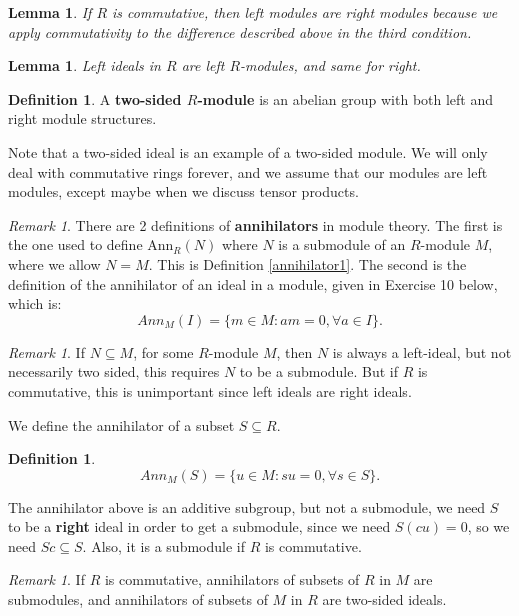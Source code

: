 \documentclass[9pt,reqno,twoside]{amsbook}
\theoremstyle{plain}
\numberwithin{section}{chapter}
\numberwithin{equation}{chapter}
\newtheorem{lem}[theorem]{Lemma}
\theoremstyle{definition}
\newtheorem{Def}[theorem]{Definition}
\theoremstyle{remark}
\newtheorem{rem}[theorem]{Remark}
\theoremstyle{plain}
\newcommand{\sub}{\subseteq}
\begin{document}
\begin{lem}
If $R$ is commutative, then left modules are right modules because we apply commutativity to the difference described above in the third condition. 
\end{lem}

\begin{lem}
Left ideals in $R$ are left $R$-modules, and same for right. 
\end{lem}

\begin{Def}
A \textbf{two-sided $R$-module} is an abelian group with both left and right module structures. 
\end{Def}
Note that a two-sided ideal is an example of a two-sided module. We will only deal with commutative rings forever, and we assume that our modules are left modules, except maybe when we discuss tensor products. 

\begin{rem}
There are 2 definitions of \textbf{annihilators} in module theory. The first is the one used to define Ann$_R(N)$ where $N$ is a submodule of an $R$-module $M$, where we allow $N = M$. This is Definition \ref{annihilator1}. The second is the definition of the annihilator of an ideal in a module, given in Exercise 10 below, which is:
$$
Ann_M(I) = \{m \in M: am = 0, \forall a \in I\}.
$$
\end{rem}

\begin{rem}
If $N\sub M$, for some $R$-module $M$, then $N$ is always a left-ideal, but not necessarily two sided, this requires $N$ to be a submodule. But if $R$ is commutative, this is unimportant since left ideals are right ideals. 
\end{rem}

We define the annihilator of a subset $S \sub R$. 

\begin{Def}
$$
Ann_M(S) = \{u \in M: su = 0, \forall s \in S\}.
$$
\end{Def}

The annihilator above is an additive subgroup, but not a submodule, we need $S$ to be a \textbf{right} ideal in order to get a submodule, since we need $S(cu) = 0$, so we need $Sc \sub S$.  Also, it is a submodule if $R$ is commutative. 

\begin{rem}
If $R$ is commutative, annihilators of subsets of $R$ in $M$ are submodules, and annihilators of subsets of $M$ in $R$ are two-sided ideals. 
\end{rem}
\end{document}
